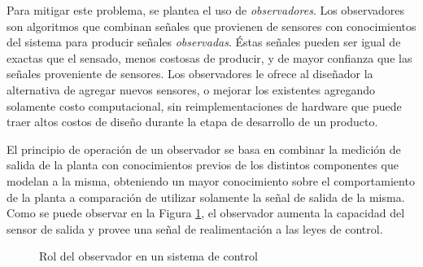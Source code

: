 \documentclass[10pt,a4paper]{article}
\begin{document}
\noindent Para mitigar este problema, se plantea el uso de \emph{observadores}. 
Los observadores son algoritmos que combinan señales que provienen de sensores 
con conocimientos del sistema para producir señales \emph{observadas}. 
\'Estas señales pueden ser igual de exactas que el sensado, menos costosas de 
producir, y de mayor confianza que las señales proveniente de sensores. 
Los observadores le ofrece al diseñador la alternativa de agregar nuevos 
sensores, o mejorar los existentes agregando solamente costo computacional, sin 
reimplementaciones de hardware que puede traer altos costos de diseño durante la
etapa de desarrollo de un producto.

\noindent El principio de operaci\'on de un observador se basa en combinar la
medici\'on de salida de la planta con conocimientos previos de los distintos 
componentes que modelan a la misma, obteniendo un mayor conocimiento sobre el 
comportamiento de la planta a comparaci\'on de utilizar solamente la señal de 
salida de la misma. Como se puede observar en la Figura \ref{role_observer}, el 
observador aumenta la capacidad del sensor de salida y provee una señal de 
realimentaci\'on a las leyes de control.

\begin{figure}[h!]
    \begin{center}
    \caption{Rol del observador en un sistema de control}
    \label{role_observer}
    \end{center}
\end{figure}
\end{document}
